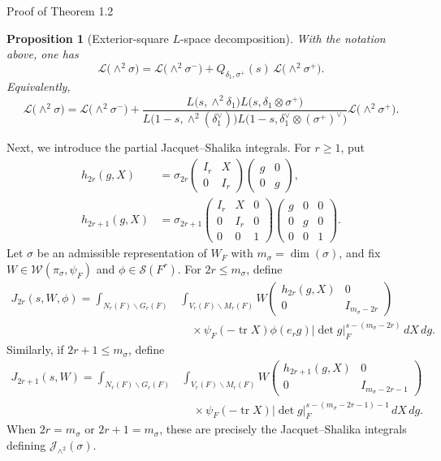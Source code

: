 \documentclass[12pt,reqno]{amsart}
\numberwithin{equation}{section}%
\numberwithin{equation}{subsection}
\newtheorem{prop}[equation]{Proposition}
\theoremstyle{definition}
\theoremstyle{remark}
\begin{document}
\begin{section}{Proof of Theorem 1.2}
\begin{prop}[Exterior-square $L$-space decomposition]
\label{prop:exterior-square-L-space-decomposition}
With the notation above, one has
\[
\mathcal{L}\bigl(\wedge^2\sigma\bigr)
=
\mathcal{L}\bigl(\wedge^2\sigma^-\bigr)
+
Q_{\delta_1,\sigma^+}(s)\,
\mathcal{L}\bigl(\wedge^2\sigma^+\bigr).
\]
Equivalently,
\[
\mathcal{L}\bigl(\wedge^2\sigma\bigr)
=
\mathcal{L}\bigl(\wedge^2\sigma^-\bigr)
+
\frac{
L\bigl(s,\wedge^2\delta_1\bigr)
L\bigl(s,\delta_1\otimes\sigma^+\bigr)
}{
L\bigl(1-s,\wedge^2(\delta_1^\vee)\bigr)
L\bigl(1-s,\delta_1^\vee\otimes(\sigma^+)^\vee\bigr)
}
\mathcal{L}\bigl(\wedge^2\sigma^+\bigr).
\]
\end{prop}

Next, we introduce the partial Jacquet--Shalika integrals. For $r\geq1$, put
\[
\begin{aligned}
h_{2r}(g,X)
&=
\sigma_{2r}
\begin{pmatrix}
I_r&X\\
0&I_r
\end{pmatrix}
\begin{pmatrix}
g&0\\
0&g
\end{pmatrix},\\[2mm]
h_{2r+1}(g,X)
&=
\sigma_{2r+1}
\begin{pmatrix}
I_r&X&0\\
0&I_r&0\\
0&0&1
\end{pmatrix}
\begin{pmatrix}
g&0&0\\
0&g&0\\
0&0&1
\end{pmatrix}.
\end{aligned}
\]
Let $\sigma$ be an admissible representation of $W_F$ with $m_\sigma = \dim(\sigma)$, and fix $W \in \mathcal{W}(\pi_\sigma, \psi_F)$ and $\phi \in \mathcal{S}(F^r)$. For $2r \le m_\sigma$, define
\[
\begin{aligned}
J_{2r}(s,W,\phi) = \int_{N_r(F)\backslash G_r(F)} &\int_{V_r(F)\backslash M_r(F)} W \begin{pmatrix} h_{2r}(g,X) & 0 \\ 0 & I_{m_\sigma-2r} \end{pmatrix} \\
&\quad \times \psi_F(-\operatorname{tr}X) \phi(e_r g) |\det g|_F^{s - (m_\sigma - 2r)} \, dX \, dg.
\end{aligned}
\]
Similarly, if $2r + 1 \le m_\sigma$, define
\[
\begin{aligned}
J_{2r+1}(s,W) = \int_{N_r(F)\backslash G_r(F)} &\int_{V_r(F)\backslash M_r(F)} W \begin{pmatrix} h_{2r+1}(g,X) & 0 \\ 0 & I_{m_\sigma-2r-1} \end{pmatrix} \\
&\quad \times \psi_F(-\operatorname{tr}X) |\det g|_F^{s - (m_\sigma - 2r - 1) - 1} \, dX \, dg.
\end{aligned}
\]
When $2r = m_\sigma$ or $2r + 1 = m_\sigma$, these are precisely the Jacquet--Shalika integrals defining $\mathcal{J}_{\wedge^2}(\sigma)$.


\end{section}
\end{document}
